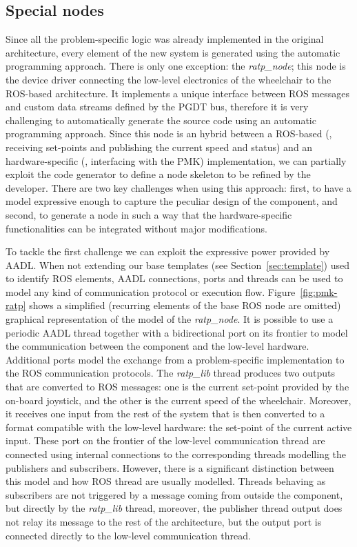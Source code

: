 \subsection{Special nodes}
\label{sec:special-node}
Since all the problem-specific logic was already implemented in the original architecture, every element of the new system is generated using the automatic programming approach. There is only one exception: the \textit{ratp\_node}; this node is the device driver connecting the low-level electronics of the wheelchair to the ROS-based architecture. It implements a unique interface between ROS messages and custom data streams defined by the PGDT bus, therefore it is very challenging to automatically generate the source code using an automatic programming approach. Since this node is an hybrid between a ROS-based (\ie, receiving set-points and publishing the current speed and status) and an hardware-specific (\ie, interfacing with the PMK) implementation, we can partially exploit the code generator to define a node skeleton to be refined by the developer. There are two key challenges when using this approach: first, to have a model expressive enough to capture the peculiar design of the component, and second, to generate a node in such a way that the hardware-specific functionalities can be integrated without major modifications.

To tackle the first challenge we can exploit the expressive power provided by AADL. When not extending our base templates (see Section~\ref{sec:template}) used to identify ROS elements,  AADL connections, ports and threads can be used to model any kind of communication protocol or execution flow. Figure~\ref{fig:pmk-ratp} shows a simplified (recurring elements of the base ROS node are omitted) graphical representation of the model of the \textit{ratp\_node}. It is possible to use a periodic AADL thread together with a bidirectional port on its frontier to model the communication between the component and the low-level hardware. Additional ports model the exchange from a problem-specific implementation to the ROS communication protocols.  The \textit{ratp\_lib} thread produces two outputs that are converted to ROS messages: one is the current set-point provided by the on-board joystick, and the other is the current speed of the wheelchair. Moreover, it receives one input from the rest of the system that is then converted to a format compatible with the low-level hardware: the set-point of the current active input. These port on the frontier of the low-level communication thread are connected using internal connections to the corresponding threads modelling the publishers and subscribers. However, there is a significant distinction between this model and how ROS thread are usually modelled. Threads behaving as subscribers are not triggered by a message coming from outside the component, but directly by the \textit{ratp\_lib} thread, moreover, the publisher thread output does not relay its message to the rest of the architecture, but the output port is connected directly to the low-level communication thread.


